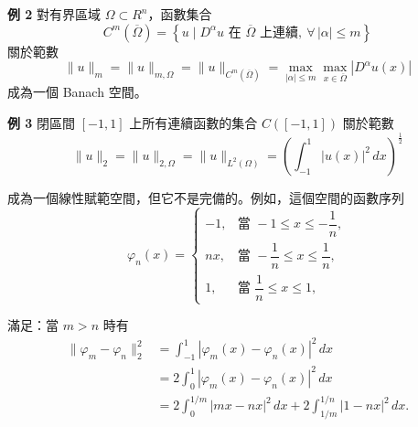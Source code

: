 \documentclass[11pt,a4paper,twoside]{article}
\newcommand{\pnum}[1]{%
    \makebox[0pt][r]{%
        \scriptsize\textbf{[#1]}\hspace{0.7em}%
    }%
}
\begin{document}
\noindent
\pnum{34}
\textbf{例 2}\quad
對有界區域 $\Omega\subset R^n$，函數集合
\[
    C^m(\overline{\Omega})
    =
    \left\{
    u\mid
    D^\alpha u\text{ 在 }\overline{\Omega}\text{ 上連續},
    \ \forall\,|\alpha|\le m
    \right\}
\]
關於範數
\[
    \|u\|_m
    =
    \|u\|_{m,\Omega}
    =
    \|u\|_{C^m(\overline{\Omega})}
    =
    \max_{|\alpha|\le m}
    \max_{x\in\overline{\Omega}}
    |D^\alpha u(x)|
\]
成為一個 Banach 空間。

\noindent
\pnum{35}
\textbf{例 3}\quad
閉區間 $[-1,1]$ 上所有連續函數的集合 $C([-1,1])$ 關於範數
\begin{equation}
    \|u\|_2
    =
    \|u\|_{2,\Omega}
    =
    \|u\|_{L^2(\Omega)}
    =
    \left(
    \int_{-1}^{1}|u(x)|^2\,dx
    \right)^{\frac12}
    \tag{2.1.1}
\end{equation}


\noindent
\pnum{36}
成為一個線性賦範空間，但它不是完備的。例如，這個空間的函數序列
\begin{equation}
    \varphi_n(x)
    =
    \begin{cases}
        -1, & \text{當 } -1\le x\le -\dfrac{1}{n},           \\[1.2ex]
        nx, & \text{當 } -\dfrac{1}{n}\le x\le \dfrac{1}{n}, \\[1.2ex]
        1,  & \text{當 } \dfrac{1}{n}\le x\le 1,
    \end{cases}
    \tag{2.1.2}
\end{equation}

滿足：當 $m>n$ 時有
\[
    \begin{aligned}
        \|\varphi_m-\varphi_n\|_2^2
         & =
        \int_{-1}^{1}
        |\varphi_m(x)-\varphi_n(x)|^2\,dx
        \\
         & =
        2\int_{0}^{1}
        |\varphi_m(x)-\varphi_n(x)|^2\,dx
        \\
         & =
        2\int_{0}^{1/m}
        |mx-nx|^2\,dx
        +
        2\int_{1/m}^{1/n}
        |1-nx|^2\,dx.
    \end{aligned}
\]
\end{document}
